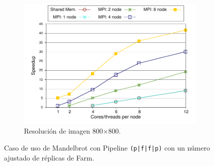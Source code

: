 \begin{figure}[!tbp]
\begin{subfigure}[b]{0.32\textwidth}
  \includegraphics[width=0.95\linewidth]{figures/graph-mpi-800-pfsp.pdf}
  \caption{Resolución de imagen 800$\times$800.}
  \label{fig:mandel-pfsp-800}
\end{subfigure}
\caption{Caso de uso de Mandelbrot con Pipeline \texttt{(p|f|f|p)} con un número ajustado de réplicas de Farm.}
\label{fig:mandel-pfsp}
\end{figure}
\vspace{0.35cm}

